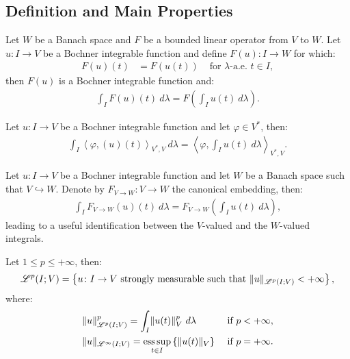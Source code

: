\newpage
\subsection{Definition and Main Properties}

\begin{corollary}
    Let $W$ be a Banach space and $F$ be a bounded linear operator from $V$ to $W$. Let $u\colon I \rightarrow V$ be a Bochner integrable function and define $F(u) \colon I \rightarrow W$ for which:
    \begin{align}
        F(u)(t) &= F(u(t)) &\text{ for } \lambda \text{-a.e. } t \in I,
    \end{align}
    then $F(u)$ is a Bochner integrable function and:
    \begin{align}
        \int_I F(u)(t) ~ d \lambda = F\left( \int_I u(t) ~ d \lambda \right).
    \end{align}
\end{corollary}

\begin{remark} %
    Let $u\colon I \rightarrow V$ be a Bochner integrable function and let $\varphi \in V^*$, then:
    \begin{align}
        \int_I \left\langle \varphi, (u)(t) \right\rangle_{V^*, V} ~ d \lambda = \left\langle \varphi, \int_I u(t) ~ d \lambda \right\rangle_{V^*, V}.
    \end{align}
\end{remark}

\begin{remark}[Embedding]
    Let $u\colon I \rightarrow V$ be a Bochner integrable function and let $W$ be a Banach space such that $V \hookrightarrow W$. Denote by $F_{V \rightarrow W} \colon V \rightarrow W$ the canonical embedding, then:
    \begin{align}
        \int_I F_{V \rightarrow W}(u)(t) ~ d \lambda = F_{V \rightarrow W}\left( \int_I u(t) ~ d \lambda \right),
    \end{align}
    leading to a useful identification between the $V$-valued and the $W$-valued integrals.
\end{remark}

\begin{definition}[$\SpaceLp{p}(I; V)$]
    Let $1 \leq p \leq +\infty$, then:
    \begin{align}
        \mathscr{L}^{p}(I; V) = \left\{ u \colon I \rightarrow V \text{ strongly measurable such that } \lVert u \rVert_{\mathscr{L}^{p}(I; V)} < +\infty \right\},
    \end{align}
    where:
    \begin{align}
        & \lVert u \rVert_{\mathscr{L}^{p}(I; V)}^p = \int_I \lVert u(t) \rVert_V^p ~ d \lambda & \text{ if } p < +\infty, \\
        & \lVert u \rVert_{\mathscr{L}^{\infty}(I; V)} = \operatorname*{ess\,sup}_{t \in I} \left\{ \lVert u(t) \rVert_V \right\} & \text{ if } p = +\infty.
    \end{align}
\end{definition}

